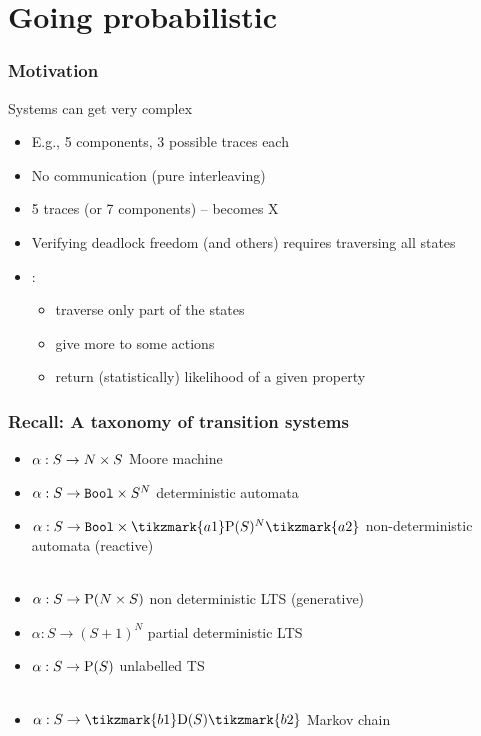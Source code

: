 \documentclass[aspectratio=169]{beamer}
\begin{document}
\section{Going probabilistic}

\begin{frame}[t]\frametitle{Motivation}
  \begin{block}{Systems can get very complex}
    \begin{itemize}
      \item E.g., 5 components, 3 possible traces each
      \item No communication (pure interleaving)
      \item 5 traces (or 7 components) -- becomes X
      \\[5mm]
      \pause
      \item Verifying deadlock freedom (and others) requires traversing all states
      \item {}:
      \begin{itemize}
        \item traverse only part of the states
        \item give more  to some actions
        \item return (statistically) likelihood of a given property
      \end{itemize}
    \end{itemize}
  \end{block}
\end{frame}

\begin{frame}[t]\frametitle{Recall: A taxonomy of transition systems}
  \begin{itemize}
    \item $\alpha: S \to N \times S$ \alert{Moore machine}
    \item $\alpha: S \to \mathtt{Bool} \times S^{N}$ \alert{deterministic automata}
    \item $\alpha: S \to \mathtt{Bool} \times \tikzmark{a1} \Pow(S)^{\Act} \tikzmark{a2}$ \alert{non-deterministic automata (reactive)}
    \\~
    \item $\alpha : S \to \mathrm{P}( N \times S )$ \alert{non deterministic LTS (generative)}
    \item $\alpha : S \to (S + 1)^N$ \alert{partial deterministic LTS} %
    \item $\alpha : S \to \mathrm{P}(S)$ \alert{unlabelled TS}
    \\~
    \item $\alpha: S \to \tikzmark{b1} \Dist(S) \tikzmark{b2}$ \alert{Markov chain}

  \end{itemize}  


\end{frame}
\end{document}
